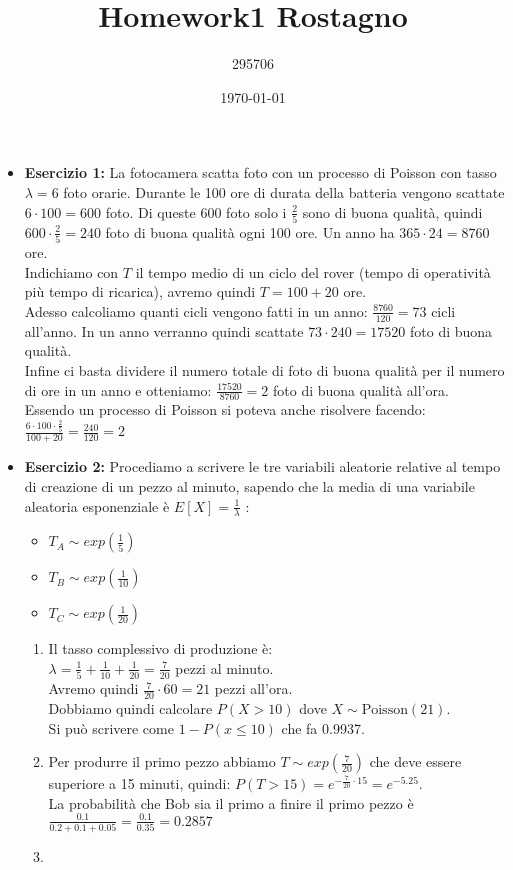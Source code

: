 \documentclass[a4paper,12pt]{article}
\begin{document}
	\title{\textbf{Homework1 Rostagno}}
	\author{295706}
	\date{\today}
	\maketitle
	
	\begin{itemize}
		\item \textbf{Esercizio 1: }La fotocamera scatta foto con un processo di Poisson con tasso $\lambda=6$ foto orarie. Durante le 100 ore di durata della batteria vengono scattate $6\cdot{100}=600$ foto. Di queste 600 foto solo i $\frac{2}{5}$ sono di buona qualità, quindi $600\cdot{\frac{2}{5}}=240$ foto di buona qualità ogni 100 ore. Un anno ha $365\cdot{24}=8760$ ore.\\
		Indichiamo con $T$ il tempo medio di un ciclo del rover (tempo di operatività più tempo di ricarica), avremo quindi $T=100+20$ ore.\\
		Adesso calcoliamo quanti cicli vengono fatti in un anno: $\frac{8760}{120}=73$ cicli all'anno. In un anno verranno quindi scattate $73\cdot{240}=17520$ foto di buona qualità.\\
		Infine ci basta dividere il numero totale di foto di buona qualità per il numero di ore in un anno e otteniamo: $\frac{17520}{8760}=2$ foto di buona qualità all'ora.\\
		Essendo un processo di Poisson si poteva anche risolvere facendo:\\ $\frac{6\cdot100\cdot\frac{2}{5}}{100+20}=\frac{240}{120}=2$
		\item \textbf{Esercizio 2: }Procediamo a scrivere le tre variabili aleatorie relative al tempo di creazione di un pezzo al minuto, sapendo che la media di una variabile aleatoria esponenziale è $E[X]=\frac{1}{\lambda}$ :\\
		\begin{itemize}
			\item $T_A\sim exp(\frac{1}{5})$
			\item $T_B\sim exp(\frac{1}{10})$
			\item $T_C\sim exp(\frac{1}{20})$
		\end{itemize}
		\begin{enumerate}[label=\alph*)]
			\item Il tasso complessivo di produzione è:\\
			$\lambda=\frac{1}{5}+\frac{1}{10}+\frac{1}{20}=\frac{7}{20}$ pezzi al minuto.\\
			Avremo quindi $\frac{7}{20} \cdot 60=21$ pezzi all'ora.\\
			Dobbiamo quindi calcolare $P(X > 10)$ dove $X \sim \text{Poisson}(21)$.\\
			Si può scrivere come $1-P(x\leq10)$ che fa 0.9937.\\
			\item Per produrre il primo pezzo abbiamo $T\sim exp(\frac{7}{20})$ che deve essere superiore a 15 minuti, quindi: $P(T > 15)=e^{-\frac{7}{20}\cdot15}=e^{-5.25}.$\\
			La probabilità che Bob sia il primo a finire il primo pezzo è $\frac{0.1}{0.2+0.1+0.05}=\frac{0.1}{0.35}=0.2857$
			\item 
		\end{enumerate}
		
		
	
	\end{itemize}
	
\end{document}
